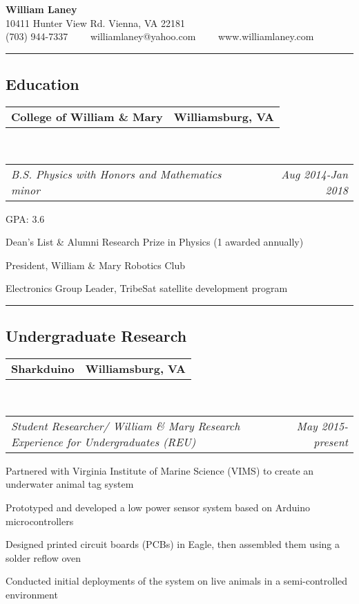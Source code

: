 \documentclass[10pt,letterpaper]{article}
\makeatletter
\newcommand{\headerrow}[2]
{\begin{tabular*}{\linewidth}{l@{\extracolsep{\fill}}r}
	#1 &
	#2 \\
\end{tabular*}}
\makeatother
\begin{document}
\begin{center}
{\LARGE \textbf{William Laney}}\\
\vspace{0.1em}
10411 Hunter View Rd.
Vienna, VA 22181
\\
(703) 944-7337\ \ \textbullet
\ \ williamlaney@yahoo.com\ \ \textbullet
\ \ www.williamlaney.com
\end{center}

\hrule
\vspace{-0.4em}
\subsection*{Education}

	\headerrow
		{\textbf{College of William \& Mary}}
		{\textbf{Williamsburg, VA}}
	\\
	\headerrow
		{\emph{B.S. Physics with Honors and Mathematics minor}}
		{\emph{Aug 2014-Jan 2018}}
	\begin{itemize*}
		\item GPA: 3.6
		\item Dean's List \& Alumni Research Prize in Physics (1 awarded annually)
		\item President, William \& Mary Robotics Club
		\item Electronics Group Leader, TribeSat satellite development program
	\end{itemize*}

\hrule
\vspace{-0.4em}
\subsection*{Undergraduate Research}

	\headerrow
		{\textbf{Sharkduino}}
		{\textbf{Williamsburg, VA}}
	\\
	\headerrow
		{\emph{Student Researcher/ William \& Mary Research Experience for Undergraduates (REU)}}
		{\emph{May 2015-present}}
	\begin{itemize*}
	\item Partnered with Virginia Institute of Marine Science (VIMS) to create an underwater animal tag system
	\item Prototyped and developed a low power sensor system based on Arduino microcontrollers
	\item Designed printed circuit boards (PCBs) in Eagle, then assembled them using a solder reflow oven
	\item Conducted initial deployments of the system on live animals in a semi-controlled environment
	
	\end{itemize*}
	
\end{document}
